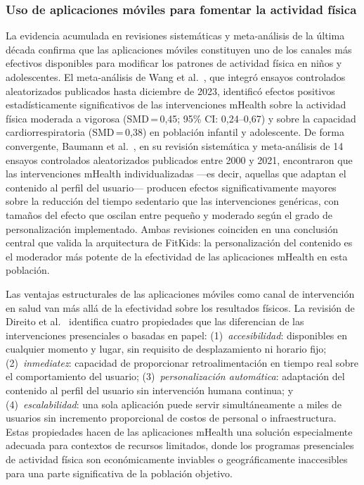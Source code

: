				\subsubsection{Uso de aplicaciones móviles para fomentar la actividad física}
					La evidencia acumulada en revisiones sistemáticas y meta-análisis de la última década confirma que las aplicaciones móviles constituyen uno de los canales más efectivos disponibles para modificar los patrones de actividad física en niños y adolescentes. El meta-análisis de Wang et al.~\cite{WangJun2024}, que integró ensayos controlados aleatorizados publicados hasta diciembre de 2023, identificó efectos positivos estadísticamente significativos de las intervenciones mHealth sobre la actividad física moderada a vigorosa (SMD\,=\,0,45; 95\% CI: 0,24--0,67) y sobre la capacidad cardiorrespiratoria (SMD\,=\,0,38) en población infantil y adolescente. De forma convergente, Baumann et al.~\cite{Baumann2022}, en su revisión sistemática y meta-análisis de 14 ensayos controlados aleatorizados publicados entre 2000 y 2021, encontraron que las intervenciones mHealth individualizadas ---es decir, aquellas que adaptan el contenido al perfil del usuario--- producen efectos significativamente mayores sobre la reducción del tiempo sedentario que las intervenciones genéricas, con tamaños del efecto que oscilan entre pequeño y moderado según el grado de personalización implementado. Ambas revisiones coinciden en una conclusión central que valida la arquitectura de FitKids: la personalización del contenido es el moderador más potente de la efectividad de las aplicaciones mHealth en esta población.
					
					Las ventajas estructurales de las aplicaciones móviles como canal de intervención en salud van más allá de la efectividad sobre los resultados físicos. La revisión de Direito et al.~\cite{Direito2017} identifica cuatro propiedades que las diferencian de las intervenciones presenciales o basadas en papel: (1)~\textit{accesibilidad}: disponibles en cualquier momento y lugar, sin requisito de desplazamiento ni horario fijo; (2)~\textit{inmediatez}: capacidad de proporcionar retroalimentación en tiempo real sobre el comportamiento del usuario; (3)~\textit{personalización automática}: adaptación del contenido al perfil del usuario sin intervención humana continua; y (4)~\textit{escalabilidad}: una sola aplicación puede servir simultáneamente a miles de usuarios sin incremento proporcional de costos de personal o infraestructura. Estas propiedades hacen de las aplicaciones mHealth una solución especialmente adecuada para contextos de recursos limitados, donde los programas presenciales de actividad física son económicamente inviables o geográficamente inaccesibles para una parte significativa de la población objetivo.
					
